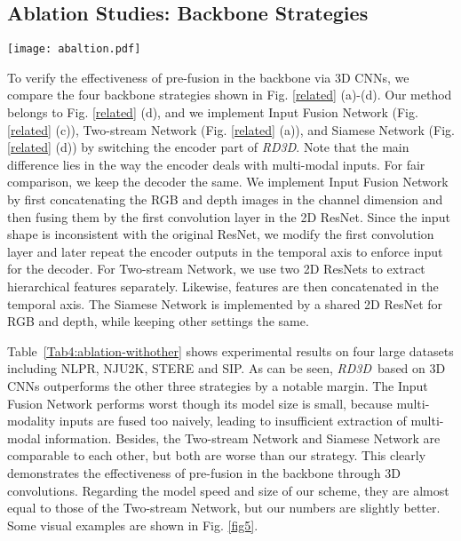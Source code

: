 \documentclass[letterpaper]{article}
\def\ourmodel{\emph{RD3D}}
\begin{document}
\subsection{Ablation Studies: Backbone Strategies}
\begin{figure*}
	\centering
	\texttt{[image: abaltion.pdf]}
	\vspace{-0.35cm}
	\caption{\small Visual results for other architectures and ablation studies. In general, \ourmodel~provides the closest results to the GT.}\vspace{-0.3cm}
	\label{fig5}
\end{figure*}
To verify the effectiveness of pre-fusion in the backbone via 3D CNNs, we compare the four backbone strategies shown in Fig. \ref{related} (a)-(d). Our method belongs to Fig. \ref{related} (d), and we implement Input Fusion Network (Fig. \ref{related} (c)), Two-stream Network (Fig. \ref{related} (a)), and Siamese Network (Fig. \ref{related} (d)) by switching the encoder part of \ourmodel. Note that the main difference lies in the way the encoder deals with multi-modal inputs. For fair comparison, we keep the decoder the same.
We implement Input Fusion Network by first concatenating the RGB and depth images in the channel dimension and then fusing them by the first convolution layer in the 2D ResNet. Since the input shape is inconsistent with the original ResNet, we modify the first convolution layer and later repeat the encoder outputs in the temporal axis to enforce input  for the decoder. For Two-stream Network, we use two 2D ResNets to extract hierarchical features separately. Likewise, features are then concatenated in the temporal axis. The Siamese Network is implemented by a shared 2D ResNet for RGB and depth, while keeping other settings the same.

Table~\ref{Tab4:ablation-withother} shows experimental results on four large datasets including NLPR, NJU2K, STERE and SIP.
As can be seen, \ourmodel~based on 3D CNNs outperforms the other three strategies by a notable margin. The Input Fusion Network performs worst though its model size is small, because multi-modality inputs are fused too naively, leading to insufficient extraction of multi-modal information. Besides, the Two-stream Network and Siamese Network are comparable to each other, but both are worse than our strategy. This clearly demonstrates the effectiveness of pre-fusion in the backbone through 3D convolutions. Regarding the model speed and size of our scheme, they are almost equal to those of the Two-stream Network, but our numbers are slightly better. Some visual examples are shown in Fig. \ref{fig5}.
\end{document}

